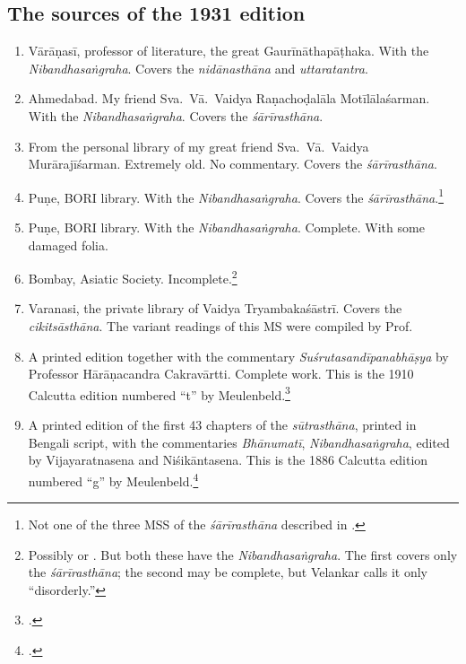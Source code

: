 \subsection{The sources of the 1931 edition}

\begin{enumerate}
   \item[1] Vārāṇasī, professor of literature, the great Gaurīnāthapāṭhaka.  With 
    the 
    \emph{Nibandhasaṅgraha}. Covers the \emph{nidānasthāna} and 
    \emph{uttaratantra}.
    
    \item [2]  Ahmedabad.  My friend Sva.\ Vā.\ Vaidya Raṇachoḍalāla 
    Motīlālaśarman.  
    With the \emph{Nibandhasaṅgraha}.  Covers the \emph{śārīrasthāna}.
    
    \item [3] From the personal library of my great friend Sva.\ Vā.\ Vaidya
    Murārajīśarman. Extremely old. No commentary.  Covers the 
    \emph{śārīrasthāna}.
    
    \item [4]  Puṇe, BORI library.  With the \emph{Nibandhasaṅgraha}. Covers the
    \emph{śārīrasthāna}.\footnote{Not one of the three MSS of the
    \emph{śārīrasthāna} described in \cite{shar-vaid}.}
    
    \item [5]  Puṇe, BORI library.  With the \emph{Nibandhasaṅgraha}. Complete.  
    With some damaged folia.
    
    \item [6]  Bombay, Asiatic Society.  Incomplete.\footnote{Possibly 
     or  \citep[v.\,1, \# 212 and 
    213]{vela-1930}.  But both these have the \emph{Nibandhasaṅgraha}.  The 
    first 
    covers only the \emph{śārīrasthāna}; the second may be complete, but 
    Velankar calls it 
    only “disorderly.”}
    
    \item [7] Varanasi, the private library of Vaidya Tryambakaśāstrī.  Covers the 
    \emph{cikitsāsthāna}.  The variant readings of this MS were compiled by Prof.\ 
    
    \item [8]  A printed edition together with the commentary 
    \emph{Suśrutasandīpanabhāṣya} by Professor Hārāṇacandra Cakravārtti. 
    Complete work.
    This is the 1910 Calcutta edition numbered “t” by Meulenbeld.\footcites[IB, 
    312]{meul-hist}{bhat-1917}
    
    \item [9] A printed edition of the first 43 chapters of the
    \emph{sūtrasthāna}, printed in Bengali script, with the commentaries
    \emph{Bhānumatī}, \emph{Nibandhasaṅgraha}, edited by Vijayaratnasena and
    Niśikāntasena. This is the 1886 Calcutta edition numbered “g” by 
    Meulenbeld.\footcites[IB,
    311]{meul-hist}{sena-1886}
\end{enumerate}
%

